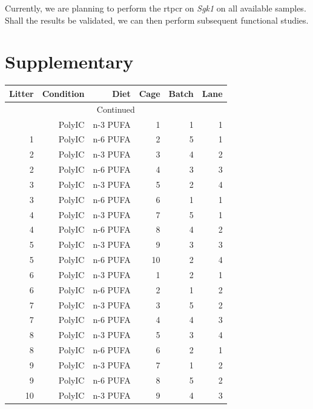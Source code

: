 Currently, we are planning to perform the \gls{rtpcr} on \textit{Sgk1} on all available samples. 
Shall the results be validated, we can then perform subsequent functional studies. 

\newpage
\section{Supplementary}
\begin{center}
	\begin{longtable}[H]{rrrrrr}
			\toprule
			Litter & Condition & Diet  & Cage  & Batch & Lane \\
			\midrule
			\endhead
			\hline
			\multicolumn{6}{c}{Continued}\\
			\bottomrule
			\endfoot
			\bottomrule
			\endlastfoot
			    1     & PolyIC & n-3 PUFA & 1     & 1     & 1 \\
			    1     & PolyIC & n-6 PUFA & 2     & 5     & 1 \\
			    2     & PolyIC & n-3 PUFA & 3     & 4     & 2 \\
			    2     & PolyIC & n-6 PUFA & 4     & 3     & 3 \\
			    3     & PolyIC & n-3 PUFA & 5     & 2     & 4 \\
			    3     & PolyIC & n-6 PUFA & 6     & 1     & 1 \\
			    4     & PolyIC & n-3 PUFA & 7     & 5     & 1 \\
			    4     & PolyIC & n-6 PUFA & 8     & 4     & 2 \\
			    5     & PolyIC & n-3 PUFA & 9     & 3     & 3 \\
			    5     & PolyIC & n-6 PUFA & 10    & 2     & 4 \\
			    6     & PolyIC & n-3 PUFA & 1     & 2     & 1 \\
			    6     & PolyIC & n-6 PUFA & 2     & 1     & 2 \\
			    7     & PolyIC & n-3 PUFA & 3     & 5     & 2 \\
			    7     & PolyIC & n-6 PUFA & 4     & 4     & 3 \\
			    8     & PolyIC & n-3 PUFA & 5     & 3     & 4 \\
			    8     & PolyIC & n-6 PUFA & 6     & 2     & 1 \\
			    9     & PolyIC & n-3 PUFA & 7     & 1     & 2 \\
			    9     & PolyIC & n-6 PUFA & 8     & 5     & 2 \\
			    10    & PolyIC & n-3 PUFA & 9     & 4     & 3 \\

\end{longtable}
\end{center}
